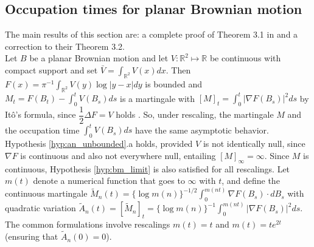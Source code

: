 \documentclass[final]{amsart}
\theoremstyle{definition}
\numberwithin{equation}{section}
\newcommand{\dR}{\ensuremath{\mathbb{R}}}
\begin{document}

\subsection{Occupation times for planar Brownian motion}\label{ssec:occupation_times}

The main results of this section are: a complete proof of Theorem 3.1 in  \citet{Kasahara/Kotani:1979}
and a correction to their Theorem 3.2.\\

Let $B$ be a planar Brownian motion and let $V: \dR^2 \mapsto \dR$ be continuous with compact support
and set $\bar V= \int_{\dR^2}V(x)dx$. Then
$F(x) = \pi^{-1}\int_{\dR^2}V(y) \log|y-x|dy$ is bounded and
$
M_t = F(B_t) - \int_0^t V(B_s)ds$ is a martingale with $[M]_t = \int_0^t |\nabla F(B_s)|^2ds$
by It\^o's formula, since $\dfrac{1}{2}\Delta F = V$ holds \citep[Theorems 6.21 and 10.2]{Lieb/Loss:2001}.
So, under rescaling, the martingale $M$ and the occupation time $\int_0^t V(B_s)ds$ have the same asymptotic behavior.
Hypothesis \ref{hyp:an_unbounded}.a holds, provided $V$ is not identically null, since $\nabla F$ is continuous
and also not everywhere null, entailing $[M]_\infty = \infty$. Since $M$ is continuous,
Hypothesis \ref{hyp:bm_limit} is also satisfied for all rescalings.
Let $m(t)$ denote a numerical function that goes to $\infty$ with $t$, and define the continuous martingale
$\tilde M_n(t) =\{\log{m(n)}\}^{-1/2} \int_0^{m(nt)}\nabla F(B_s)\cdot dB_s$ with quadratic variation
$\tilde A_n(t)=[\tilde M_n]_t =\{\log{m(n)}\}^{-1} \int_0^{m(nt)} |\nabla F(B_s)|^2ds$.
The common formulations involve rescalings $m(t)=t$ and $m(t)=te^{2t}$ (ensuring that $\tilde A_n(0)=0$).
\end{document}
